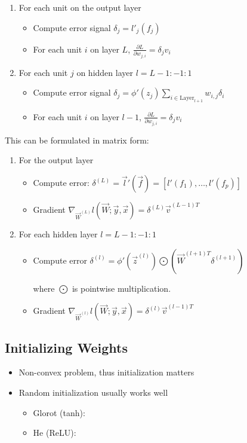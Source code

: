 \documentclass[8pt,a4paper]{scrartcl}
\begin{document}
\begin{multicols*}{3}
\begin{enumerate}
\ncompaq
\item For each unit on the output layer
\begin{itemize}
\ncompaq
\item Compute error signal $\delta_j=l'_j(f_j)$
\item For each unit $i$ on layer $L$, $\frac{\partial L}{\partial w_{j,i}}=\delta_j v_i$
\end{itemize}
\item For each unit $j$ on hidden layer $l=L-1:-1:1$
\begin{itemize}
\ncompaq
\item Compute error signal $\delta_j=\phi'(z_j)\sum\limits_{i\in\text{Layer}_{l+1}}w_{i,j}\delta_i$
\item For each unit $i$ on layer $l-1$, $\frac{\partial L}{\partial w_{j,i}}=\delta_j v_i$
\end{itemize}
\end{enumerate}

This can be formulated in matrix form:

\begin{enumerate}
\ncompaq
\item For the output layer
\begin{itemize}
\ncompaq
\item Compute error: $\delta^{(L)}=\vec{l}'(\vec{f})=[l'(f_1),\ldots,l'(f_p)]$
\item Gradient $\nabla_{\vec{W}^{(L)}}l(\vec{W};\vec{y},\vec{x})=\delta^{(L)}\vec{v}^{(L-1)T}$
\end{itemize}
\item For each hidden layer $l=L-1:-1:1$
\begin{itemize}
\ncompaq
\item Compute error $\delta^{(l)}=\phi'\left(\vec{z}^{(l)}\right)\bigodot\left(\vec{W}^{(l+1)T}\delta^{(l+1)}\right)$

where $\bigodot$ is pointwise multiplication.
\item Gradient $\nabla_{\vec{W}^{(l)}}l(\vec{W};\vec{y},\vec{x})=\delta^{(l)}\vec{v}^{(l-1)T}$
\end{itemize}
\end{enumerate}

\subsection{Initializing Weights}

\begin{itemize}
\ncompaq
\item Non-convex problem, thus initialization matters
\item Random initialization usually works well
\begin{itemize}
\ncompaq
\item Glorot (tanh): 
\item He (ReLU): 
\end{itemize}
\end{itemize}


\end{multicols*}
\end{document}
